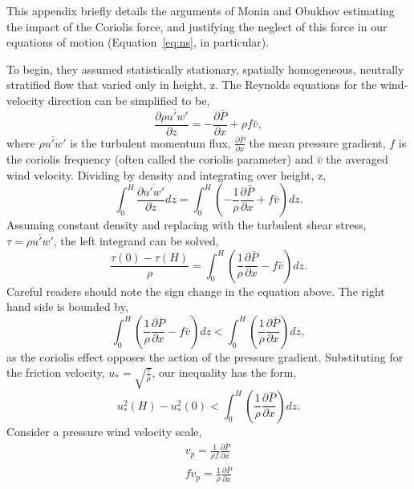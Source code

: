 \label{appendix:coriolis}

This appendix briefly details the arguments of Monin and
Obukhov\cite{monin1954basic} estimating the impact of the Coriolis
force, and justifying the neglect of this force in our equations of
motion (Equation~\ref{eq:ns}, in particular). 

To begin, they assumed statistically stationary, spatially homogeneous,
neutrally stratified flow that varied only in height, z. The Reynolds
equations for the wind-velocity direction can be simplified to be,  
\begin{equation}
 \frac{\partial \overline{\rho u'w'}}{\partial z} = -\frac{\partial
  \bar P}{\partial x} + \rho f \bar v, 
\end{equation}
where $\overline{\rho u'w'}$ is the turbulent momentum flux, $\frac{\partial
\bar P}{\partial x} $  the mean pressure gradient, $f$ is the coriolis
frequency (often called the coriolis parameter) and $\bar v$ the
averaged wind velocity. Dividing by density and integrating over height,
z,  
\begin{equation}
 \int_0^H \frac{\partial \overline{u'w'}}{\partial z} dz = \int_0^H
  \left( -\frac{1}{\rho} \frac{\partial \bar P}{\partial x} + f \bar v
  \right) dz.  
\end{equation}
Assuming constant density and replacing with the turbulent shear stress,
$\tau = \overline{\rho u'w'}$, the left integrand can be solved,  
\begin{equation}
\frac{\tau(0) - \tau(H)}{\rho} = \int_0^H
  \left( \frac{1}{\rho} \frac{\partial \bar P}{\partial x} - f \bar v
  \right) dz.  
\end{equation}
Careful readers should note the sign change in the equation above. The
right hand side is bounded by, 
\begin{equation}
\int_0^H  \left( \frac{1}{\rho} \frac{\partial \bar P}{\partial x} - f \bar v
  \right) dz < \int_0^H  \left( \frac{1}{\rho} \frac{\partial \bar
  P}{\partial x}  \right) dz,
\end{equation}
as the coriolis effect opposes the action of the pressure
gradient. Substituting for the friction velocity, $u_* =
\sqrt{\frac{\tau}{\rho}}$, our inequality has the form,
\begin{equation}
u^2_*(H) - u^2_*(0)  < \int_0^H  \left( \frac{1}{\rho} \frac{\partial
				  \bar P}{\partial x}  \right) dz. 
\label{eq:cor_f}
\end{equation}
Consider a pressure wind velocity scale, 
\begin{align}
 v_p = \frac{1}{\rho f} \frac{\partial \bar P}{\partial x}  \\
 f v_p = \frac{1}{\rho} \frac{\partial \bar P}{\partial x} 
\end{align}
